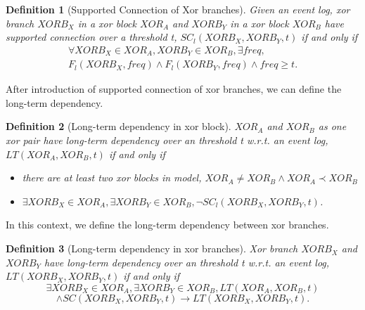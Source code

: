\documentclass[]{article}
\newtheorem{mydef}{Definition}[section]
\begin{document}
\begin{mydef}[Supported Connection of Xor branches\footnotemark]
Given an event log, xor branch $XORB_X$ in a xor block $XOR_A$ and $XORB_Y$ in a xor block $XOR_B$ have supported connection over a threshold t, $SC_{l}(XORB_X,XORB_Y,t)$ if and only if
\begin{align*}
 \forall  XORB_X \in XOR_A, XORB_Y \in XOR_B, \exists freq, \\
 F_{l}(XORB_X,freq) \land F_{l}(XORB_Y,freq) \land freq \geq t. 
\end{align*}
\end{mydef}
After introduction of supported connection of xor branches, we can define the long-term dependency. 
\begin{mydef}[Long-term dependency in xor block]
	$XOR_A$ and $XOR_B$ as one xor pair have long-term dependency over an threshold t w.r.t. an event log, $LT(XOR_A, XOR_B, t) $ if and only if 
	\begin{itemize}
		\item there are at least two xor blocks in model, $XOR_A \neq XOR_B \land XOR_A \prec XOR_B$
		\item $\exists XORB_X \in XOR_A, \exists XORB_Y \in XOR_B, \lnot SC_{l}(XORB_X, XORB_Y, t)$. 
	\end{itemize}
\end{mydef}
In this context, we define the long-term dependency between xor branches.
\begin{mydef}[Long-term dependency in xor branches]
	Xor branch $XORB_X$ and $XORB_Y$ have long-term dependency over an threshold t w.r.t. an event log, $LT(XORB_X, XORB_Y, t) $ if and only if  
	\[\exists XORB_X \in XOR_A, \exists XORB_Y \in XOR_B, LT(XOR_A, XOR_B, t) \] \[ \land  SC(XORB_X, XORB_Y, t)  \rightarrow LT(XORB_X, XORB_Y, t).\]	
\end{mydef}
\end{document}
